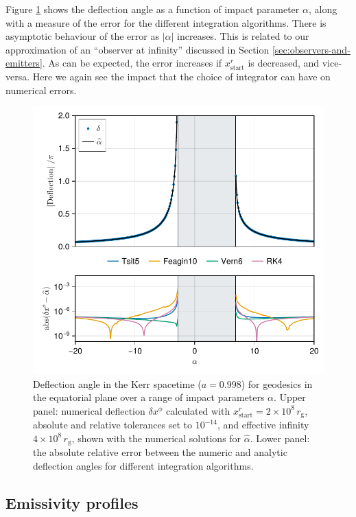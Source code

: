 \documentclass[fleqn,usenatbib]{mnras}
\newcommand{\rg}{r_\text{g}}
\begin{document}
Figure \ref{fig:deflection-angle} shows the deflection angle as a function of
impact parameter $\alpha$, along with a  measure of the error for the different
integration algorithms. There is asymptotic behaviour of the error as $\lvert
\alpha \rvert$ increases. This is related to our approximation of an ``observer
at infinity'' discussed in Section \ref{sec:observers-and-emitters}. As can be
expected, the error increases if $x^r_\text{start}$ is decreased, and
vice-versa. Here we again see the impact that the choice of integrator can have
on numerical errors.

\begin{figure}
    \centering
    \includegraphics[width=0.94\columnwidth]{figures/deflection.iyer-hansen.pdf}
    \caption{Deflection angle in the Kerr spacetime ($a = 0.998$) for geodesics
        in the equatorial plane over a range of impact parameters $\alpha$.
        Upper panel: numerical deflection $\delta x^\phi$ calculated with
        $x^r_\text{start} = 2 \times 10^8 \, \rg$, absolute and relative
        tolerances set to $10^{-14}$, and effective infinity $4 \times 10^8\,
        \rg$, shown with the numerical solutions for $\hat{\alpha}$. Lower
        panel: the absolute relative error between the numeric and analytic
        deflection angles for different integration algorithms.}
    \label{fig:deflection-angle}
\end{figure}

\subsection{Emissivity profiles}
\end{document}
